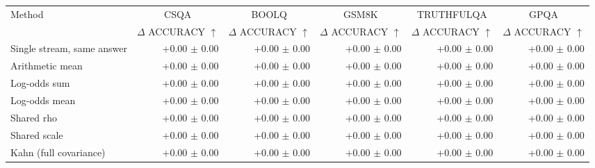 \begin{tabular}{lrrrrr}
\toprule
Method & \multicolumn{1}{c}{CSQA} & \multicolumn{1}{c}{BOOLQ} & \multicolumn{1}{c}{GSM8K} & \multicolumn{1}{c}{TRUTHFULQA} & \multicolumn{1}{c}{GPQA} \\
 & $\Delta$ ACCURACY $\uparrow$ & $\Delta$ ACCURACY $\uparrow$ & $\Delta$ ACCURACY $\uparrow$ & $\Delta$ ACCURACY $\uparrow$ & $\Delta$ ACCURACY $\uparrow$ \\
\midrule
Single stream, same answer & +0.00 {\scriptsize $\pm$ 0.00} & +0.00 {\scriptsize $\pm$ 0.00} & +0.00 {\scriptsize $\pm$ 0.00} & +0.00 {\scriptsize $\pm$ 0.00} & +0.00 {\scriptsize $\pm$ 0.00} \\
Arithmetic mean & +0.00 {\scriptsize $\pm$ 0.00} & +0.00 {\scriptsize $\pm$ 0.00} & +0.00 {\scriptsize $\pm$ 0.00} & +0.00 {\scriptsize $\pm$ 0.00} & +0.00 {\scriptsize $\pm$ 0.00} \\
Log-odds sum & +0.00 {\scriptsize $\pm$ 0.00} & +0.00 {\scriptsize $\pm$ 0.00} & +0.00 {\scriptsize $\pm$ 0.00} & +0.00 {\scriptsize $\pm$ 0.00} & +0.00 {\scriptsize $\pm$ 0.00} \\
Log-odds mean & +0.00 {\scriptsize $\pm$ 0.00} & +0.00 {\scriptsize $\pm$ 0.00} & +0.00 {\scriptsize $\pm$ 0.00} & +0.00 {\scriptsize $\pm$ 0.00} & +0.00 {\scriptsize $\pm$ 0.00} \\
Shared rho & +0.00 {\scriptsize $\pm$ 0.00} & +0.00 {\scriptsize $\pm$ 0.00} & +0.00 {\scriptsize $\pm$ 0.00} & +0.00 {\scriptsize $\pm$ 0.00} & +0.00 {\scriptsize $\pm$ 0.00} \\
Shared scale & +0.00 {\scriptsize $\pm$ 0.00} & +0.00 {\scriptsize $\pm$ 0.00} & +0.00 {\scriptsize $\pm$ 0.00} & +0.00 {\scriptsize $\pm$ 0.00} & +0.00 {\scriptsize $\pm$ 0.00} \\
Kahn (full covariance) & +0.00 {\scriptsize $\pm$ 0.00} & +0.00 {\scriptsize $\pm$ 0.00} & +0.00 {\scriptsize $\pm$ 0.00} & +0.00 {\scriptsize $\pm$ 0.00} & +0.00 {\scriptsize $\pm$ 0.00} \\

\end{tabular}
